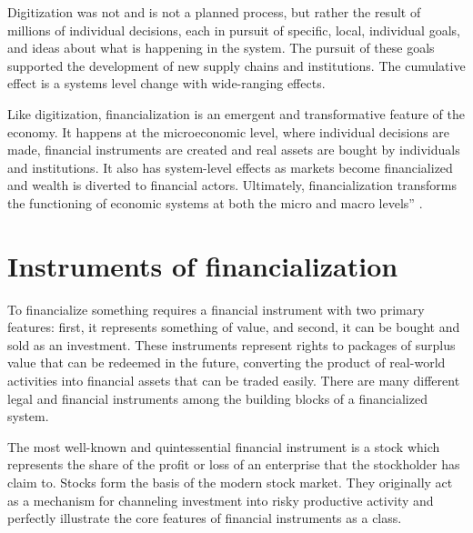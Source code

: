 Digitization was not and is not a planned process, but rather the result of millions of individual decisions, each in pursuit of specific, local, individual goals, and ideas about what is happening in the system. The pursuit of these goals supported the development of  new supply chains and institutions. %
The cumulative effect is a systems level change with wide-ranging effects.  

Like digitization, financialization is an emergent and transformative feature of the economy. It happens at the microeconomic level, where individual decisions are made, financial instruments are created and real assets are bought by individuals and institutions. It also has system-level effects as markets become financialized and wealth is diverted to financial actors. Ultimately, financialization transforms the functioning of economic systems at both the  micro and macro levels'' \cite{palleyFinancializationWhatIt2007}.  


\section{Instruments of financialization }

To financialize something requires a \gls{financial instrument} with two primary features: first, it represents something of value, and second, it can be bought and sold as an investment. These instruments represent rights to packages of surplus value that can be redeemed in the future, converting the product of real-world activities into financial assets that can be traded easily.   %
There are many different legal and financial instruments among the building blocks of a financialized system. 

The most well-known and quintessential financial instrument is a stock which represents the share of the profit or loss of an enterprise that the stockholder has claim to. Stocks form the basis of the modern stock market. %
They originally act as a mechanism for channeling investment into risky productive activity and perfectly illustrate the core features of financial instruments as a class. %

